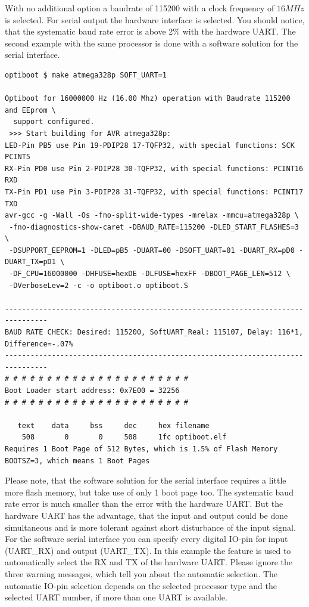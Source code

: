 With no additional option a baudrate of 115200 with a clock frequency of \(16 MHz\) is selected.
For serial output the hardware interface is selected.
You should notice, that the systematic baud rate error is above 2\% with the hardware UART.
The second example with the same processor is done with a software solution for the serial interface.

\begin{verbatim}
optiboot $ make atmega328p SOFT_UART=1

Optiboot for 16000000 Hz (16.00 Mhz) operation with Baudrate 115200 and EEprom \
  support configured.
 >>> Start building for AVR atmega328p:
LED-Pin PB5 use Pin 19-PDIP28 17-TQFP32, with special functions: SCK PCINT5
RX-Pin PD0 use Pin 2-PDIP28 30-TQFP32, with special functions: PCINT16 RXD
TX-Pin PD1 use Pin 3-PDIP28 31-TQFP32, with special functions: PCINT17 TXD
avr-gcc -g -Wall -Os -fno-split-wide-types -mrelax -mmcu=atmega328p \
 -fno-diagnostics-show-caret -DBAUD_RATE=115200 -DLED_START_FLASHES=3 \
 -DSUPPORT_EEPROM=1 -DLED=pB5 -DUART=00 -DSOFT_UART=01 -DUART_RX=pD0 -DUART_TX=pD1 \
 -DF_CPU=16000000 -DHFUSE=hexDE -DLFUSE=hexFF -DBOOT_PAGE_LEN=512 \
 -DVerboseLev=2 -c -o optiboot.o optiboot.S

--------------------------------------------------------------------------------
BAUD RATE CHECK: Desired: 115200, SoftUART_Real: 115107, Delay: 116*1, Difference=-.07%
--------------------------------------------------------------------------------
# # # # # # # # # # # # # # # # # # # # # #
Boot Loader start address: 0x7E00 = 32256
# # # # # # # # # # # # # # # # # # # # # #

   text    data     bss     dec     hex filename
    508       0       0     508     1fc optiboot.elf
Requires 1 Boot Page of 512 Bytes, which is 1.5% of Flash Memory
BOOTSZ=3, which means 1 Boot Pages

\end{verbatim}

Please note, that the software solution for the serial interface requires a little more flash memory,
but take use of only 1 boot page too. The systematic baud rate error is much smaller than the error with the hardware UART.
But the hardware UART has the advantage, that the input and output could be done simultaneous and is more tolerant against
short disturbance of the input signal.
For the software serial interface you can specify every digital IO-pin for input (UART\_RX) and output (UART\_TX). 
In this example the feature is used to automatically select the RX and TX of the hardware UART.
Please ignore the three warning messages, which tell you about the automatic selection.
The automatic IO-pin selection depends on the selected processor type and the selected UART number, if more than
one UART is available.


